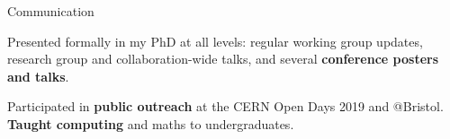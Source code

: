 \begin{cventries}
    \cventry
    {}
    {Communication}
    {}
    {}
    {
      \begin{cvitems}
        \item {Presented formally in my PhD at all levels: regular working group updates, research group and collaboration-wide talks, and several \textbf{conference posters and talks}.}
        \item {Participated in \textbf{public outreach} at the CERN Open Days 2019 and @Bristol. \textbf{Taught computing} and maths to undergraduates.}
        \end{cvitems}
    }

\end{cventries}
